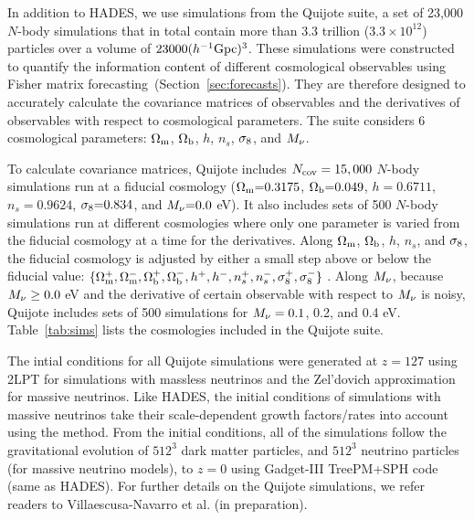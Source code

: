 In addition to HADES, we use simulations from the Quijote suite, a
set of 23,000 $N$-body simulations that in total contain more than 3.3 trillion 
($3.3\times10^{12}$) particles over a volume of $23000 (h^{-1}{\rm Gpc})^3$. 
These simulations were constructed to quantify the information content of 
different cosmological observables using Fisher matrix forecasting~(Section~\ref{sec:forecasts}). 
They are therefore designed to accurately calculate 
the covariance matrices of observables and the derivatives of observables with 
respect to cosmological parameters. The suite considers 6 cosmological parameters: 
$\Omega_{\rm m}$, $\Omega_{\rm b}$, $h$, $n_s$, $\sigma_8$, and $M_\nu$.

To calculate covariance matrices, Quijote includes $N_{\rm cov} = 15,000$ $N$-body 
simulations run at a fiducial cosmology ($\Omega_{\rm m}{=}0.3175$, $\Omega_{\rm b}{=}0.049$, $h{=}0.6711$, 
$n_s{=}0.9624$, $\sigma_8{=}0.834$, and $M_\nu{=}0.0$ eV). It also includes sets 
of 500 $N$-body simulations run at different cosmologies where only one parameter 
is varied from the fiducial cosmology at a time for the derivatives. Along $\Omega_{\rm m}$, 
$\Omega_{\rm b}$, $h$, $n_s$, and $\sigma_8$, the fiducial cosmology is adjusted by either a 
small step above or below the fiducial value: 
$\{\Omega_{\rm m}^{+}, \Omega_{\rm m}^{-}, \Omega_{\rm b}^{+}, \Omega_{\rm b}^{-}, h^+, h^-, n_s^{+}, n_s^{-}, \sigma_8^{+}, \sigma_8^-\}$ . 
Along $M_\nu$, because $M_\nu \ge 0.0$ eV and the derivative of certain observable 
with respect to $M_\nu$ is noisy, Quijote includes sets of 500 simulations for 
$M_\nu = 0.1$, 0.2, and 0.4 eV. Table~\ref{tab:sims} lists the cosmologies included 
in the Quijote suite. 

The intial conditions for all Quijote simulations were generated at $z=127$ using 
2LPT for simulations with massless neutrinos and the Zel’dovich approximation for 
massive neutrinos. Like HADES, the initial conditions of simulations with massive
neutrinos take their scale-dependent growth factors/rates into account using the
\cite{zennaro2017a} method. From the initial conditions, all of the simulations 
follow the gravitational evolution of $512^3$ dark matter particles, and $512^3$ 
neutrino particles (for massive neutrino models), to $z=0$ using {\sc Gadget-III}
TreePM+SPH code (same as HADES). 
For further details on the Quijote simulations, we refer readers to 
Villaescusa-Navarro et al. (in preparation). 

